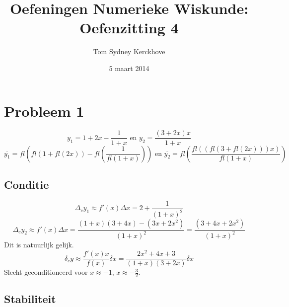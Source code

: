 \documentclass[12pt,a4paper]{article}
\author{Tom Sydney Kerckhove}
\title{Oefeningen Numerieke Wiskunde:\\ Oefenzitting 4}
\date{5 maart 2014}
\begin{document}
\maketitle

\section{Probleem 1}
\[
y_1 = 1+2x-\frac{1}{1+x}
 \text{ en } 
y_2 = \frac{(3+2x)x}{1+x}
\]
\[
\overline{y_1} = fl\left(fl(1+fl(2x))-fl\left(\frac{1}{fl(1+x)}\right)\right)
 \text{ en } 
\overline{y_2} = fl\left(\frac{fl((fl(3+fl(2x)))x)}{fl(1+x)}\right)
\]

\subsection{Conditie}
\[
\Delta_cy_1 \approx f'(x)\Delta x
= 2 + \frac{1}{(1+x)^2}
\]
\[
\Delta_cy_2 \approx f'(x)\Delta x
= \frac{(1+x)(3+4x)-(3x+2x^2)}{(1+x)^2}
= \frac{(3+4x+2x^2)}{(1+x)^2}
\]
Dit is natuurlijk gelijk.
\[
\delta_cy \approx \frac{f'(x)x}{f(x)}\delta x
= \frac{2x^2+4x+3}{(1+x)(3+2x)}\delta x
\]
Slecht geconditioneerd voor $x\approx-1$, $x \approx -\frac{3}{2}$.

\subsection{Stabiliteit}
\end{document}
